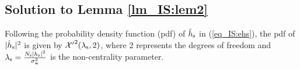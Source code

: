 {%

\section{}


\subsection{Solution to Lemma \ref{lm_IS:lem2}} \label{ssec_IS:lem2} 
\begin{IEEEproof}[Solution]
Following the probability density function (pdf) of $\hat{h}_{\text{s}}$ in (\ref{eq_IS:ehs}), the pdf of $|\hat{h}_{\text{s}}|^2$ is given by $\ncchi2(\ls,2)$, where 2 represents the degrees of freedom and $\lambda_{\text{s}} = \frac{N_{\text{s}} |h_{\text{s}}|^2}{\sigma^2_{\text{w}}}$ is the non-centrality parameter.


\end{IEEEproof}}
